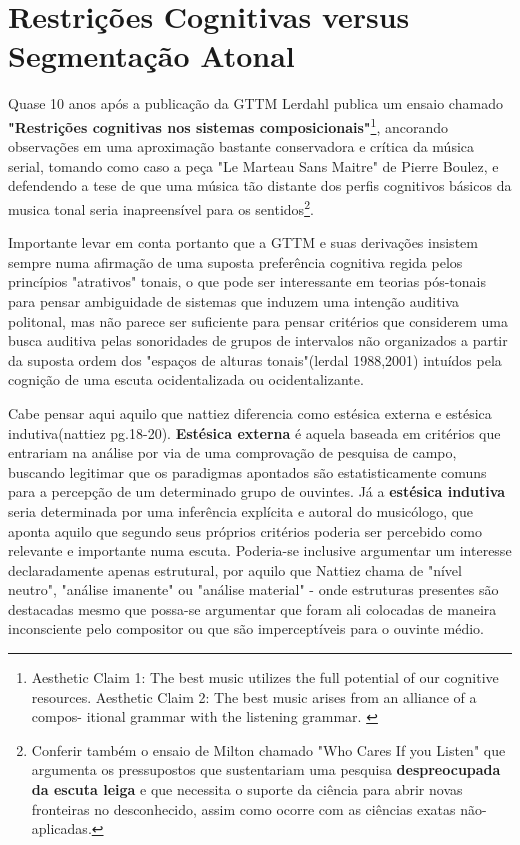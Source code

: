 \documentclass[
	12pt,				%
	openright,			%
	twoside,			%
	a4paper,			%
	english,			%
	french,				%
	spanish,			%
	brazil				%
	]{abntex2}
\begin{document}
\section{Restrições Cognitivas versus Segmentação Atonal}


Quase 10 anos após a publicação da GTTM Lerdahl publica um ensaio chamado \textbf{"Restrições cognitivas nos sistemas composicionais"}\cite{lerdahl1992cognitive}\footnote{
Aesthetic Claim 1: The best music utilizes the full potential of our
cognitive resources. Aesthetic Claim 2: The best music arises from an alliance of a compos-
itional grammar with the listening grammar. \cite{lerdahl1992cognitive}
}, ancorando observações em uma aproximação bastante conservadora e crítica da música serial, tomando como caso a peça "Le Marteau Sans Maitre" de Pierre Boulez, e defendendo a tese de que uma música tão distante dos perfis cognitivos básicos da musica tonal seria inapreensível para os sentidos\footnote{Conferir também o ensaio de Milton  chamado "Who Cares If you Listen" que argumenta os pressupostos que sustentariam uma pesquisa \textbf{despreocupada da escuta leiga} e que necessita o suporte da ciência para abrir novas fronteiras no desconhecido, assim como ocorre com as ciências exatas não-aplicadas. }. 

Importante levar em conta portanto que a GTTM e suas derivações insistem sempre numa afirmação de uma suposta preferência cognitiva regida pelos princípios "atrativos" tonais, o que pode ser interessante em teorias pós-tonais para pensar ambiguidade de sistemas que induzem uma intenção auditiva politonal, mas não parece ser suficiente para pensar critérios que considerem uma busca auditiva pelas sonoridades de grupos de intervalos não organizados a partir da suposta ordem dos "espaços de alturas tonais"(lerdal 1988,2001) intuídos pela cognição de uma escuta ocidentalizada ou ocidentalizante.

Cabe pensar aqui aquilo que nattiez diferencia como estésica externa e estésica indutiva(nattiez pg.18-20). \textbf{Estésica externa} é aquela baseada em critérios que entrariam na análise por via de uma comprovação de pesquisa de campo, buscando legitimar que os paradigmas apontados são estatisticamente comuns para a percepção de um determinado grupo de ouvintes. Já a \textbf{estésica indutiva} seria determinada por uma inferência explícita e autoral do musicólogo, que aponta aquilo que segundo seus próprios critérios poderia ser percebido como relevante e importante numa escuta. Poderia-se inclusive argumentar um interesse declaradamente apenas estrutural, por aquilo que Nattiez chama de "nível neutro", "análise imanente" ou "análise material" - onde estruturas presentes são destacadas mesmo que possa-se argumentar que foram ali colocadas de maneira inconsciente pelo compositor ou que são imperceptíveis para o ouvinte médio.
\end{document}
